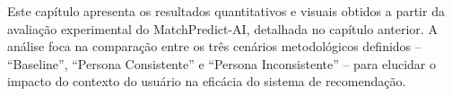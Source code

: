 
Este capítulo apresenta os resultados quantitativos e visuais obtidos a partir da avaliação experimental do MatchPredict-AI, detalhada no capítulo anterior. A análise foca na comparação entre os três cenários metodológicos definidos -- ``Baseline'', ``Persona Consistente'' e ``Persona Inconsistente'' -- para elucidar o impacto do contexto do usuário na eficácia do sistema de recomendação.


